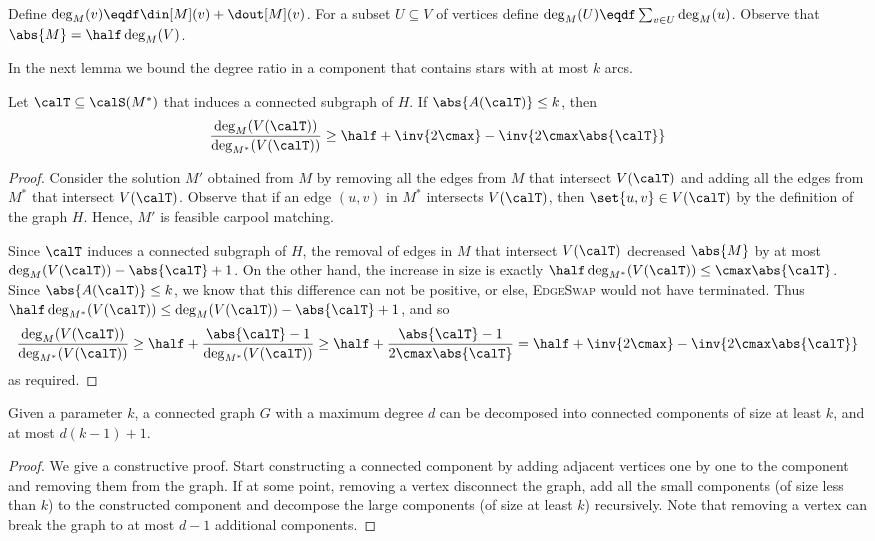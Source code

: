 Define $\deg_M(v) \eqdf \din[M](v) + \dout[M](v)$.  For a subset
$U \subseteq V$ of vertices define $\deg_M(U) \eqdf \sum_{v \in
U} \deg_M(u)$.
%
Observe that $\abs{M} = \half \deg_M(V)$.

In the next lemma we bound the degree ratio in a component that
contains stars with at most $k$ arcs.

\begin{lemma}
\label{lemma:r}
Let $\calT \subseteq \calS(M^*)$ that induces a connected subgraph of
$H$.  If $\abs{A(\calT)} \leq k$, then
\[
\frac{\deg_M(V(\calT))}{\deg_{M^*}(V(\calT))} 
\geq \half + \inv{2\cmax} - \inv{2\cmax\abs{\calT}}
\]
\end{lemma}
\begin{proof}
Consider the solution $M'$ obtained from $M$ by removing all the
edges from $M$ that intersect $V(\calT)$ and adding all the edges from
$M^*$ that intersect $V(\calT)$.  Observe that if an edge $(u,v)$ in
$M^*$ intersects $V(\calT)$, then $\set{u,v} \in V(\calT)$ by the
definition of the graph $H$.  Hence, $M'$ is feasible carpool
matching.

Since $\calT$ induces a connected subgraph of $H$, the removal of
edges in $M$ that intersect $V(\calT)$ decreased $\abs{M}$ by at most
$\deg_M(V(\calT)) - \abs{\calT} + 1$.
%
On the other hand, the increase in size is exactly
 $\half \deg_{M^*}(V(\calT)) \leq \cmax \abs{\calT}$.
%
Since $\abs{A(\calT)} \leq k$, we know that this difference can not be
positive, or else, \textsc{EdgeSwap} would not have terminated.  Thus
\(
\half \deg_{M^*}(V(\calT)) \leq \deg_M(V(\calT)) - \abs{\calT} + 1
\),
and so
\[
\frac{\deg_M(V(\calT))}{\deg_{M^*}(V(\calT))}
\geq \half + \frac{\abs{\calT} - 1}{\deg_{M^*}(V(\calT))}
\geq \half + \frac{\abs{\calT} - 1}{2\cmax \abs{\calT}}
=    \half + \inv{2\cmax} - \inv{2\cmax \abs{\calT}}
\]
as required.
\end{proof}


\iffalse %

\begin{lemma}
Given a parameter $k$, a connected graph $G$ with a maximum degree $d$
can be decomposed into connected components of size at least $k$, and
at most $d(k-1) + 1$.
\end{lemma}

\begin{proof}
We give a constructive proof.  Start constructing a connected
component by adding adjacent vertices one by one to the component and
removing them from the graph.  If at some point, removing a vertex
disconnect the graph, add all the small components (of size less than
$k$) to the constructed component and decompose the large components
(of size at least $k$) recursively.  Note that removing a vertex can
break the graph to at most $d - 1$ additional components.
\end{proof}


